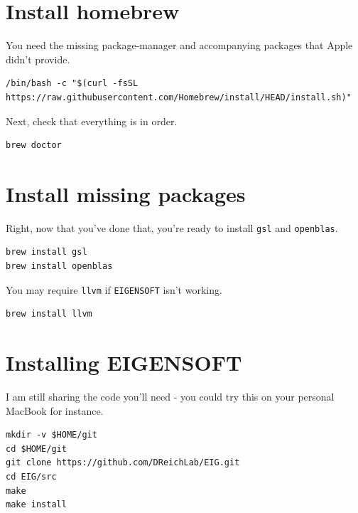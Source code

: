 \documentclass[
]{book}
\newcommand{\passthrough}[1]{#1}
\begin{document}
\hypertarget{install-homebrew}{%
\section{Install homebrew}\label{install-homebrew}}

You need the missing package-manager and accompanying packages that Apple didn't provide.

\begin{lstlisting}
/bin/bash -c "$(curl -fsSL https://raw.githubusercontent.com/Homebrew/install/HEAD/install.sh)"
\end{lstlisting}

Next, check that everything is in order.

\begin{lstlisting}
brew doctor
\end{lstlisting}

\hypertarget{install-missing-packages}{%
\section{Install missing packages}\label{install-missing-packages}}

Right, now that you've done that, you're ready to install \passthrough{\lstinline!gsl!} and \passthrough{\lstinline!openblas!}.

\begin{lstlisting}
brew install gsl
brew install openblas
\end{lstlisting}

You may require \passthrough{\lstinline!llvm!} if \passthrough{\lstinline!EIGENSOFT!} isn't working.

\begin{lstlisting}
brew install llvm
\end{lstlisting}

\hypertarget{installing-eigensoft}{%
\section{Installing EIGENSOFT}\label{installing-eigensoft}}

I am still sharing the code you'll need - you could try this on your personal MacBook for instance.

\begin{lstlisting}
mkdir -v $HOME/git
cd $HOME/git
git clone https://github.com/DReichLab/EIG.git
cd EIG/src
make
make install
\end{lstlisting}
\end{document}
